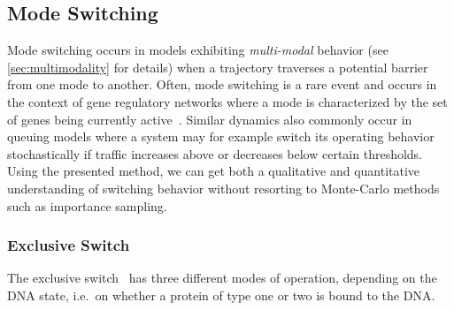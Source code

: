 \subsection{Mode Switching}
Mode switching occurs in models exhibiting   \emph{multi-modal} behavior (see \autoref{sec:multimodality} for details) when a trajectory   traverses a potential barrier from one mode
to another.
Often, mode switching is a rare event and occurs in the context of gene regulatory networks where a mode is characterized by the set of genes being currently active~\cite{loinger2007stochastic}. 
Similar dynamics also commonly occur in queuing models where a system may for example switch its operating  behavior stochastically if
traffic increases above or decreases below certain thresholds.
Using the presented method, we can get both a   qualitative and quantitative understanding of   switching
behavior without resorting to Monte-Carlo methods such as   importance sampling.

\subsubsection{Exclusive Switch}
The exclusive switch~\cite{barzel2008calculation}  has three different modes of operation, depending on the
\ac{DNA} state, i.e.\ on whether a protein of type one or two is bound to
the \ac{DNA}.

